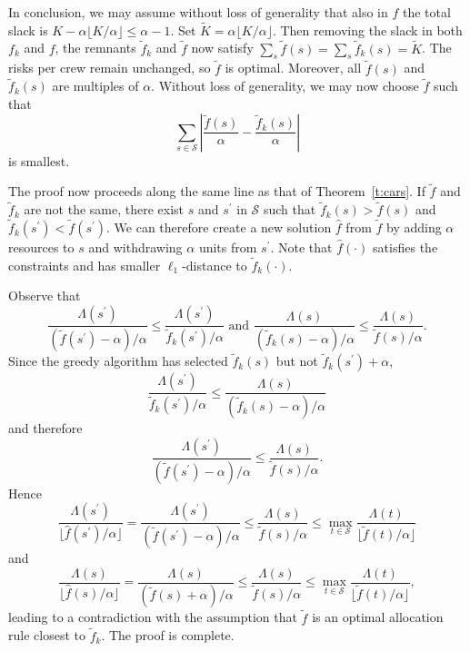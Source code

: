\documentclass[10pt,a4paper]{amsart}
\renewenvironment{proof}[1]{\par\medskip\noindent\textbf{#1}\enspace\ignorespaces}{\par\medskip}
\begin{document}
\begin{proof}{}
In conclusion, we may assume without loss 
of generality that also in $f$ the total slack is 
$K - \alpha \lfloor K/\alpha \rfloor \leq \alpha - 1$. 
Set $\tilde K = \alpha \lfloor K/ \alpha \rfloor$. Then 
removing the slack in both $f_k$ and $f$, the remnants 
$\tilde f_k$ and $\tilde f$ now satisfy 
$\sum_s \tilde f(s) = \sum_s \tilde f_k(s) = \tilde K$.
The risks per crew remain unchanged, so $\tilde f$ 
is optimal. Moreover, all $\tilde f(s)$ and $\tilde f_k(s)$ are 
multiples of $\alpha$. Without loss of generality, we may 
now choose $\tilde f$ such that 
\[
\sum_{s\in \mathcal{S}} \left|
 \frac{\tilde f(s)}{\alpha} 
 - \frac{\tilde f_k(s)}{\alpha} 
\right|
\]
is smallest. 

The proof now proceeds along the same line as that of 
Theorem~\ref{t:cars}. If $\tilde f$ and $\tilde f_k$ are not 
the same, there exist $s$ and $s^\prime$ in $\mathcal{S}$
such that $\tilde f_k(s) > \tilde f(s)$ and 
$\tilde f_k(s^\prime) < \tilde f(s^\prime)$. 
We can therefore create a new solution $\hat f$ from 
$\tilde f$ by adding $\alpha$ resources to $s$ and 
withdrawing $\alpha$ units from $s^\prime$. Note that 
$\hat f(\cdot)$ satisfies the constraints and has
smaller $\ell_1$-distance to $\tilde f_k(\cdot)$.  

Observe that
\[
\frac{\Lambda(s^\prime)}
    { ( \tilde f(s^\prime)-\alpha) / \alpha }
    \leq \frac{\Lambda(s^\prime)}
     { \tilde f_k(s^\prime) / \alpha }
\mbox{ and }
   \frac{\Lambda(s)}
   { (\tilde f_k(s) -\alpha)/ \alpha}
   \leq  \frac{\Lambda(s)}
    {\tilde f(s) / \alpha }.
\]
Since the greedy algorithm has selected $\tilde f_k(s)$ but not
$\tilde f_k(s^\prime) + \alpha$,
\[
\frac{\Lambda(s^\prime)}
    { \tilde f_k(s^\prime) / \alpha  }
     \leq  \frac{\Lambda(s)}
    { (\tilde f_k(s) - \alpha)/ \alpha  }
\]
and therefore
\[
\frac{\Lambda(s^\prime)}
    {  ( \tilde f(s^\prime)-\alpha) / \alpha  }
    \leq \frac{\Lambda(s)}
    {  \tilde f(s) / \alpha  }.
\]
Hence 
\[
\frac{\Lambda(s^\prime)}
    { \lfloor \hat f(s^\prime) / \alpha \rfloor } =
\frac{\Lambda(s^\prime)}
    {  ( \tilde f(s^\prime)-\alpha) / \alpha } \leq 
    \frac{\Lambda(s)}
    {  \tilde f(s) / \alpha }
    \leq \max_{t\in \mathcal{S}} \frac{\Lambda(t)}
    { \lfloor \tilde f(t) / \alpha \rfloor }
\]
and
\[
\frac{\Lambda(s)}
    { \lfloor \hat f(s) / \alpha \rfloor } =
\frac{\Lambda(s)}
    {  ( \tilde f(s)+ \alpha) / \alpha} \leq 
    \frac{\Lambda(s)}
    {  \tilde f(s) / \alpha }
    \leq \max_{t\in \mathcal{S}} \frac{\Lambda(t)}
    { \lfloor \tilde f(t) / \alpha \rfloor },
\]
leading to a contradiction with the assumption that $\tilde f$
is an optimal allocation rule closest to $\tilde f_k$. The proof is complete.
\end{proof}
\end{document}
